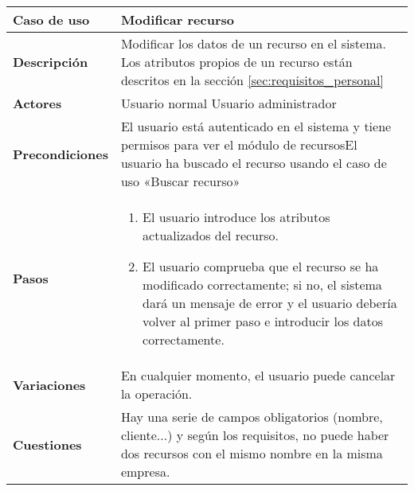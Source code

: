 \begin{tabular}{|p{1.25in}|p{3.65in}|}\hline
\textbf{Caso de uso} & \textbf{Modificar recurso}\\\hline\hline
\textbf{Descripción} & Modificar los datos de un recurso en el sistema. Los
atributos propios de un recurso están descritos en la sección
\ref{sec:requisitos_personal}\\\hline
\textbf{Actores} & Usuario normal \newline Usuario administrador\\\hline
\textbf{Precondiciones} & El usuario está autenticado en el sistema y
tiene permisos para ver el módulo de recursos\newline El usuario ha
buscado el recurso usando el caso de uso «Buscar recurso»\\\hline
\textbf{Pasos} & 
  \begin{enumerate}
   \item El usuario introduce los atributos actualizados del recurso.
   \item El usuario comprueba que el recurso se ha modificado correctamente; si
no, el sistema dará un mensaje de error y el usuario debería volver al primer
paso e introducir los datos correctamente.
  \end{enumerate}
\\\hline
\textbf{Variaciones} & En cualquier momento, el usuario puede cancelar
la operación.\\\hline
\textbf{Cuestiones} & Hay una serie de campos obligatorios (nombre,
cliente...) y según los requisitos, no puede haber dos recursos
con el mismo nombre en la misma empresa.\\\hline
\end{tabular}

